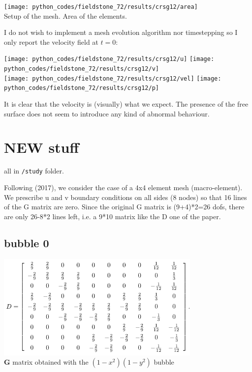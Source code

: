 \begin{center}
\texttt{[image: python\_codes/fieldstone\_72/results/crsg12/area]}\\
{\captionfont Setup of the mesh. Area of the elements.}
\end{center}

I do not wish to implement a mesh evolution algorithm nor timestepping so
I only report the velocity field at $t=0$:

\begin{center}
\texttt{[image: python\_codes/fieldstone\_72/results/crsg12/u]}
\texttt{[image: python\_codes/fieldstone\_72/results/crsg12/v]}\\
\texttt{[image: python\_codes/fieldstone\_72/results/crsg12/vel]}
\texttt{[image: python\_codes/fieldstone\_72/results/crsg12/p]}
\end{center}

It is clear that the velocity is (visually) what we expect. The presence of the free surface 
does not seem to introduce any kind of abnormal behaviour. 


\newpage
\section*{NEW stuff}

all in {\tt /study} folder.

Following \textcite{lami17} (2017), we consider the case of a 4x4 element mesh (macro-element).
We prescribe u and v boundary conditions on all sides (8 nodes) so that
16 lines of the G matrix are zero. Since the original G matrix is (9+4)*2=26 dofs, 
there are only 26-8*2 lines left, i.e. a 9*10 matrix like the D one of the paper.

\subsection*{bubble 0}

\begin{center}
\includegraphics[width=10cm]{python_codes/fieldstone_72/images/mat1}\\
{\captionfont ${\bm G}$ matrix obtained with the $(1-x^2)(1-y^2)$ bubble}
\end{center}

